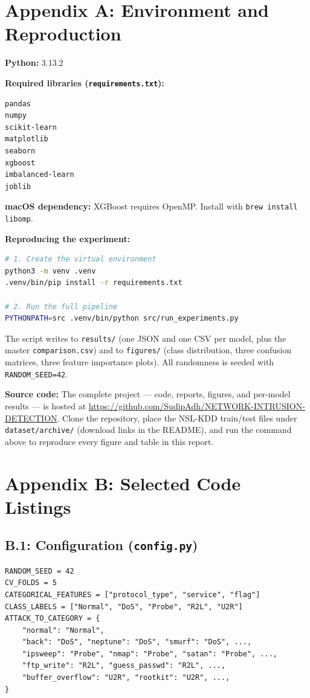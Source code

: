 \documentclass[11pt, a4paper]{article}
\begin{document}
\appendix
\section*{Appendix A: Environment and Reproduction}

\textbf{Python:} 3.13.2

\textbf{Required libraries (\texttt{requirements.txt}):}
\begin{lstlisting}[language=bash, basicstyle=\ttfamily\small, numbers=none]
pandas
numpy
scikit-learn
matplotlib
seaborn
xgboost
imbalanced-learn
joblib
\end{lstlisting}

\textbf{macOS dependency:} XGBoost requires OpenMP. Install with \texttt{brew install libomp}.

\textbf{Reproducing the experiment:}
\begin{lstlisting}[language=bash, basicstyle=\ttfamily\small, numbers=none]
# 1. Create the virtual environment
python3 -m venv .venv
.venv/bin/pip install -r requirements.txt

# 2. Run the full pipeline
PYTHONPATH=src .venv/bin/python src/run_experiments.py
\end{lstlisting}

The script writes to \texttt{results/} (one JSON and one CSV per model, plus the master \texttt{comparison.csv}) and to \texttt{figures/} (class distribution, three confusion matrices, three feature importance plots). All randomness is seeded with \texttt{RANDOM\_SEED=42}.

\textbf{Source code:} The complete project --- code, reports, figures, and per-model results --- is hosted at \url{https://github.com/SudipAdh/NETWORK-INTRUSION-DETECTION}. Clone the repository, place the NSL-KDD train/test files under \texttt{dataset/archive/} (download links in the README), and run the command above to reproduce every figure and table in this report.

\section*{Appendix B: Selected Code Listings}

\subsection*{B.1: Configuration (\texttt{config.py})}
\begin{lstlisting}[caption={Central configuration: paths, label maps, hyperparameters.}]
RANDOM_SEED = 42
CV_FOLDS = 5
CATEGORICAL_FEATURES = ["protocol_type", "service", "flag"]
CLASS_LABELS = ["Normal", "DoS", "Probe", "R2L", "U2R"]
ATTACK_TO_CATEGORY = {
    "normal": "Normal",
    "back": "DoS", "neptune": "DoS", "smurf": "DoS", ...,
    "ipsweep": "Probe", "nmap": "Probe", "satan": "Probe", ...,
    "ftp_write": "R2L", "guess_passwd": "R2L", ...,
    "buffer_overflow": "U2R", "rootkit": "U2R", ...,
}
\end{lstlisting}
\end{document}
